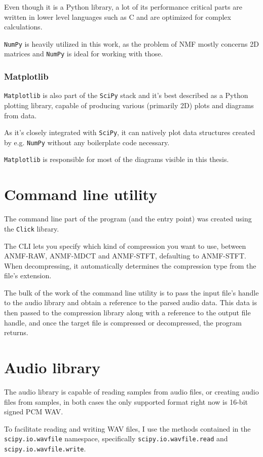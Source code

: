 Even though it is a Python library, a lot of its performance critical parts are written in lower level languages such as C and are optimized for complex calculations.

\verb|NumPy| is heavily utilized in this work, as the problem of NMF mostly concerns 2D matrices and \verb|NumPy| is ideal for working with those.

\subsubsection{Matplotlib}
\verb|Matplotlib| \cite{py_matplotlib} is also part of the \verb|SciPy| stack and it's best described as a Python plotting library, capable of producing various (primarily 2D) plots and diagrams from data.

As it's closely integrated with \verb|SciPy|, it can natively plot data structures created by e.g. \verb|NumPy| without any boilerplate code necessary.

\verb|Matplotlib| is responsible for most of the diagrams visible in this thesis.

\section{Command line utility}
The command line part of the program (and the entry point) was created using the \verb|Click| library.

The CLI lets you specify which kind of compression you want to use, between ANMF-RAW, ANMF-MDCT and ANMF-STFT, defaulting to ANMF-STFT. When decompressing, it automatically determines the compression type from the file's extension.

The bulk of the work of the command line utility is to pass the input file's handle to the audio library and obtain a reference to the parsed audio data. This data is then passed to the compression library along with a reference to the output file handle, and once the target file is compressed or decompressed, the program returns.

\section{Audio library}
The audio library is capable of reading samples from audio files, or creating audio files from samples, in both cases the only supported format right now is 16-bit signed PCM WAV.

To facilitate reading and writing WAV files, I use the methods contained in the
\verb|scipy.io.wavfile| namespace, specifically \verb|scipy.io.wavfile.read| and \verb|scipy.io.wavfile.write|.

